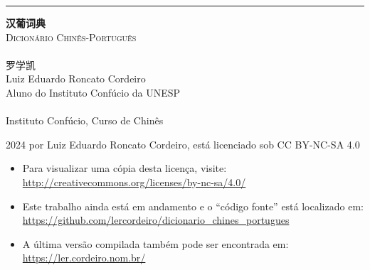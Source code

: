 \begin{titlingpage}
  \raggedleft
  \rule{1pt}{\textheight}
  \hspace{0.1\textwidth}
  \parbox[b]{0.75\textwidth}{
    \vspace{0.05\textheight}
    {\HUGE\bfseries 汉葡词典}\\[2\baselineskip] %
    {\Large\textsc{Dicionário Chinês-Português}\\%
     \large\textsc{\zhtoday}}\\%
    [4\baselineskip]
    {\Large\textsc{罗学凯}\\%
     \small Luiz Eduardo Roncato Cordeiro\\%
            Aluno do Instituto Confúcio da UNESP}\\%
    \vspace{0.5\textheight}\\%
    {Instituto Confúcio, Curso de Chinês}\\[\baselineskip] %
  }
  \newpage
  \raggedright
  \setlength{\parindent}{0pt}
  \setlength{\parskip}{\baselineskip}
  \mbox{}
  \vfill
  \footnotesize
  \textcopyright{} 2024 por Luiz Eduardo Roncato Cordeiro, está licenciado sob CC BY-NC-SA 4.0\\
  \begin{itemize}
    \item Para visualizar uma cópia desta licença, visite:\\ \url{http://creativecommons.org/licenses/by-nc-sa/4.0/}
    \item Este trabalho ainda está em andamento e o ``código fonte'' está localizado em:\\ \url{https://github.com/lercordeiro/dicionario_chines_portugues}
    \item A última versão compilada também pode ser encontrada em:\\ \url{https://ler.cordeiro.nom.br/}
  \end{itemize}
\end{titlingpage}
